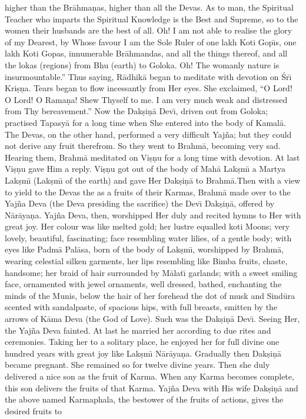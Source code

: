 higher than the Br\=ahma\d{n}as, higher than all the Devas. As to man, the Spiritual Teacher who imparts the Spiritual Knowledge is the Best and Supreme, so to the women their husbands are the best of all. Oh! I am not able to realise the glory of my Dearest, by Whose favour I am the Sole Ruler of one lakh Koti Gop\={\i}s, one lakh Koti Gopas, innumerable Br\=ahmandas, and all the things thereof, and all the lokas (regions) from Bhu (earth) to Goloka. Oh! The womanly nature is insurmountable.'' Thus saying, R\=adhik\=a began to meditate with devotion on \'Sr\={\i} Kri\d{s}\d{n}a. Tears began to flow incessantly from Her eyes. She exclaimed, ``O Lord! O Lord! O Rama\d{n}a! Shew Thyself to me. I am very much weak and distressed from Thy bereavement.'' Now the Dak\d{s}i\d{n}\=a Dev\={\i}, driven out from Goloka; practised Tapasy\=a for a long time when She entered into the body of Kamal\=a. The Devas, on the other hand, performed a very difficult Yaj\~na; but they could not derive any fruit therefrom. So they went to Brahm\=a, becoming very sad. Hearing them, Brahm\=a meditated on Vi\d{s}\d{n}u for a long time with devotion. At last Vi\d{s}\d{n}u gave Him a reply. Vi\d{s}\d{n}u got out of the body of Mah\=a Lak\d{s}m\={\i} a Martya Lak\d{s}m\={\i} (Lak\d{s}m\={\i} of the earth) and gave Her Dak\d{s}i\d{n}\=a to Brahm\=a.Then with a view to yield to the Devas the as a fruits of their Karmas, Brahm\=a made over to the Yaj\~na Deva (the Deva presiding the sacrifice) the Dev\={\i} Dak\d{s}i\d{n}\=a, offered by N\=ar\=aya\d{n}a. Yaj\~na Deva, then, worshipped Her duly and recited hymns to Her with great joy. Her colour was like melted gold; her lustre equalled koti Moons; very lovely, beautiful, fascinating; face resembling water lilies, of a gentle body; with eyes like Padm\=a Pal\=asa, born of the body of Lak\d{s}m\={\i}, worshipped by Brahm\=a, wearing celestial silken garments, her lips resembling like Bimba fruits, chaste, handsome; her braid of hair surrounded by M\=alat\={\i} garlands; with a sweet smiling face, ornamented with jewel ornaments, well dressed, bathed, enchanting the minds of the Munis, below the hair of her forehead the dot of musk and Sind\=ura scented with sandalpaste, of spacious hips, with full breasts, smitten by the arrows of K\=ama Deva (the God of Love). Such was the Dak\d{s}i\d{n}\=a Dev\={\i}. Seeing Her, the Yaj\~na Deva fainted. At last he married her according to due rites and ceremonies. Taking her to a solitary place, he enjoyed her for full divine one hundred years with great joy like Lak\d{s}m\={\i} N\=ar\=aya\d{n}a. Gradually then Dak\d{s}i\d{n}\=a became pregnant. She remained so for twelve divine years. Then she duly delivered a nice son as the fruit of Karma. When any Karma becomes complete, this son delivers the fruits of that Karma. Yaj\~na Deva with His wife Dak\d{s}i\d{n}\=a and the above named Karmaphala, the bestower of the fruits of actions, gives the desired fruits to

